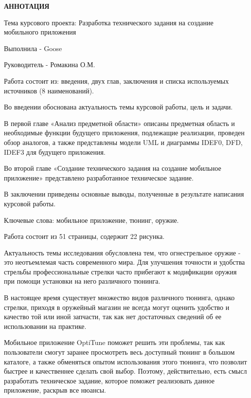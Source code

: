 \documentclass[14pt]{extreport}
\begin{document}
\pagestyle{empty} 


\pagestyle{plain}

\newpage
\begin{center}
\begin{normalsize}
\textbf{АННОТАЦИЯ}
\end{normalsize}
\end{center}

Тема курсового проекта: Разработка технического задания на создание мобильного приложения

Выполнила - Goose

Руководитель - Ромакина О.М.

Работа состоит из: введения, двух глав, заключения и списка используемых источников (8 наименований).

Во введении обоснована актуальность темы курсовой работы, цель и задачи.

В первой главе «Анализ предметной области» описаны предметная область и необходимые функции будущего приложения, подлежащие реализации, проведен обзор аналогов, а также представлены модели UML и диаграммы IDEF0, DFD, IDEF3 для будущего приложения.

Во второй главе «Создание технического задания на создание мобильное приложение» представлено разработанное техническое задание.

В заключении приведены основные выводы, полученные в результате написания курсовой работы.

Ключевые слова: мобильное приложение, тюнинг, оружие.

Работа состоит из 51 страницы, содержит 22 рисунка.

\newpage
\tableofcontents

\intro 

Актуальность темы исследования обусловлена тем, что огнестрельное оружие - это неотъемлемая часть современного мира. Для улучшения точности и удобства стрельбы профессиональные стрелки часто прибегают к модификации оружия при помощи установки на него различного тюнинга. 

В настоящее время существует множество видов различного тюнинга, однако стрелки, приходя в оружейный магазин не всегда могут оценить удобство и качество той или иной запчасти, так как нет достаточных сведений об ее использовании на практике. 

Мобильное приложение OptiTune поможет решить эти проблемы, так как пользователи смогут заранее просмотреть весь доступный тюнинг в большом каталоге, а также обменяться опытом использования этого тюнинга, что позволит быстрее и качественнее сделать свой выбор. Поэтому, действительно, есть смысл разработать техническое задание, которое поможет реализовать данное приложение, раскрыв все нюансы.
\end{document}
